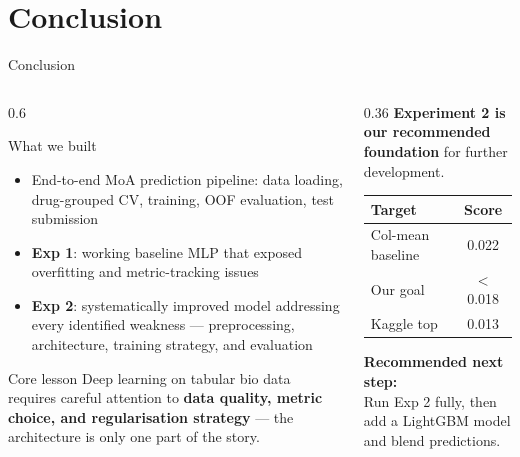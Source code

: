 \documentclass[aspectratio=169, 10pt]{beamer}
\begin{document}
\section{Conclusion}

\begin{frame}{Conclusion}
  \begin{columns}[T]
    \begin{column}{0.6\textwidth}
      \begin{block}{What we built}
        \begin{itemize}
          \item End-to-end MoA prediction pipeline:
                data loading, drug-grouped CV, training,
                OOF evaluation, test submission
          \item \textbf{Exp 1}: working baseline MLP that exposed
                overfitting and metric-tracking issues
          \item \textbf{Exp 2}: systematically improved model
                addressing every identified weakness —
                preprocessing, architecture, training strategy,
                and evaluation
        \end{itemize}
      \end{block}
      \vspace{0.4em}
      \begin{block}{Core lesson}
        Deep learning on tabular bio data requires careful
        attention to \textbf{data quality, metric choice,
        and regularisation strategy} — the architecture is
        only one part of the story.
      \end{block}
    \end{column}
    \begin{column}{0.36\textwidth}
      \textbf{Experiment 2 is our recommended foundation} for further development.

      \vspace{0.8em}
      \begin{table}
        \small
        \begin{tabular}{lc}
          \toprule
          \textbf{Target} & \textbf{Score} \\
          \midrule
          Col-mean baseline & 0.022 \\
          Our goal & $<$0.018 \\
          Kaggle top & 0.013 \\
          \bottomrule
        \end{tabular}
      \end{table}

      \vspace{0.8em}
      \textbf{Recommended next step:}\\
      Run Exp 2 fully, then add a LightGBM model and blend predictions.
    \end{column}
  \end{columns}
\end{frame}
\end{document}
